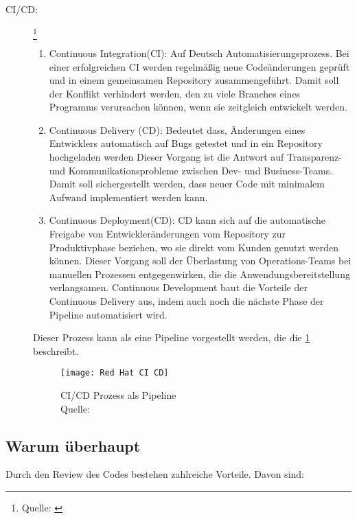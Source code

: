 \begin{description}
	\item [CI/CD:] \footnote{Quelle: \cite{RedHat}} \hfill
	\begin{enumerate}
		\item Continuous Integration(CI):
			Auf Deutsch Automatisierungsprozess. Bei einer erfolgreichen CI werden regelmäßig neue Codeänderungen geprüft und in einem gemeinsamen Repository zusammengeführt. Damit soll 			der Konflikt verhindert werden, den zu viele Branches eines Programms verursachen können, wenn sie zeitgleich entwickelt werden.
		\item Continuous Delivery (CD): Bedeutet dass, Änderungen eines Entwicklers automatisch auf Bugs getestet und in ein Repository hochgeladen werden Dieser Vorgang ist die Antwort 			auf Transparenz- und Kommunikationsprobleme zwischen Dev- und Business-Teams. Damit soll sichergestellt werden, dass neuer Code mit minimalem Aufwand implementiert werden 					kann.
		\item Continuous Deployment(CD):
			CD kann sich auf die automatische Freigabe von Entwickleränderungen vom Repository zur Produktivphase beziehen, wo sie direkt vom Kunden genutzt werden können. Dieser 						Vorgang soll der Überlastung von Operations-Teams bei manuellen Prozessen entgegenwirken, die die Anwendungsbereitstellung verlangsamen. Continuous Development baut die 					Vorteile der Continuous Delivery aus, indem auch noch die nächste Phase der Pipeline automatisiert wird.
	\end{enumerate}

	Dieser Prozess kann als eine Pipeline vorgestellt werden, die die \cref{fig:RedHat} beschreibt.
	\begin{figure}[H]
		\centering
		\texttt{[image: Red Hat CI CD]}
		\caption[\ac{CI}/\ac{CD}]{\ac{CI}/\ac{CD} Prozess als Pipeline\\ Quelle:\cite{RedHat}}
		\label{fig:RedHat}
	\end{figure}
	
\end{description}

\subsection{Warum überhaupt}
\label{subsec:Gründe}
Durch den Review des Codes bestehen zahlreiche Vorteile. Davon sind:

